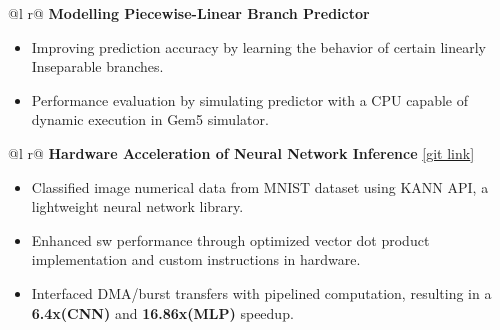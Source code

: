 \documentclass[a4paper,10pt]{article}
\begin{document}
\begin{tabularx}{\linewidth}{ @{}l r@{} }
\textbf{Modelling Piecewise-Linear Branch Predictor} \\[2.75pt]
{
\begin{minipage}[t]{\linewidth}
    \begin{itemize}[nosep,after=\strut, leftmargin=2em, itemsep=3pt]
    \item Improving prediction accuracy by learning the behavior of certain linearly Inseparable branches.  
    \item Performance evaluation by simulating predictor with a CPU capable of dynamic execution in Gem5 simulator.
    
    \end{itemize}
\end{minipage}
} 
\end{tabularx}
\begin{tabularx}{\linewidth}{ @{}l r@{} }
{\textbf{Hardware Acceleration of Neural Network Inference} \href{https://github.com/sharathat45/Vector-dot-product}{[\underline{git link}]}}\\[2.75pt]
{
\begin{minipage}[t]{\linewidth}
    \begin{itemize}[nosep,after=\strut, leftmargin=2em, itemsep=3pt]
    \item Classified image numerical data from MNIST dataset using KANN API, a lightweight neural network library.

    \item Enhanced sw performance through optimized vector dot product implementation and custom instructions in hardware.
    
    

    \item Interfaced DMA/burst transfers with pipelined computation, resulting in a \textbf{6.4x(CNN)} and \textbf{16.86x(MLP)} speedup.
    \end{itemize}
\end{minipage}
} %
\end{tabularx}
\end{document}
